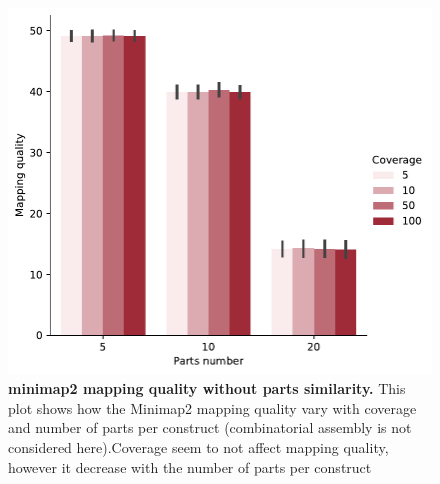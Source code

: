 \documentclass[11pt, a4paper]{article}
\begin{document}
   \begin{figure}[ht]
    \begin{center}
    \includegraphics[width=1\textwidth]{../results/images_notebook/v_400/minimap_sim_00_mapping_quality.pdf}
    \end{center}
    \caption{{\bf  minimap2 mapping quality without parts similarity.} This plot shows how the Minimap2 mapping quality vary with coverage and number of parts per construct (combinatorial assembly is not considered here).Coverage seem to not affect mapping quality, however it decrease with the number of parts per construct}
   \label{fig:v_400_mapping_quality_sim_0}
\end{figure}
\end{document}
